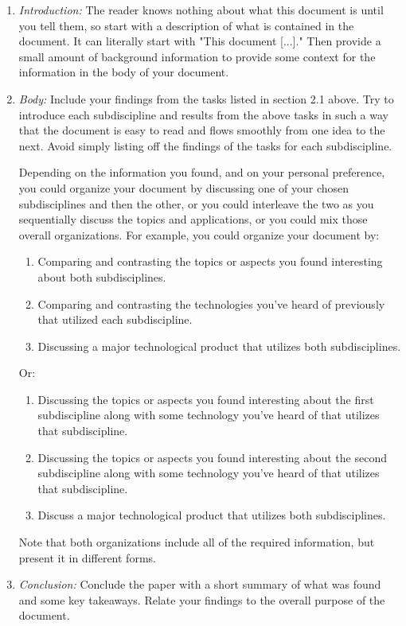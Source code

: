 \documentclass[12pt]{article}
\begin{document}
\begin{enumerate}
    \item \textit{Introduction:} The reader knows nothing about what this document is until you tell them, so start with a description of what is contained in the document.  It can literally start with "This document [...]." Then provide a small amount of background information to provide some context for the information in the body of your document.
    
    \item \textit{Body:} Include your findings from the tasks listed in section 2.1 above. Try to introduce each subdiscipline and results from the above tasks in such a way that the document is easy to read and flows smoothly from one idea to the next. Avoid simply listing off the findings of the tasks for each subdiscipline.
    
    Depending on the information you found, and on your personal preference, you could organize your document by discussing one of your chosen subdisciplines and then the other, or you could interleave the two as you sequentially discuss the topics and applications, or you could mix those overall organizations.  For example, you could organize your document by:
    \begin{enumerate}
        \item Comparing and contrasting the topics or aspects you found interesting about both subdisciplines.
        \item Comparing and contrasting the technologies you've heard of previously that utilized each subdiscipline.
        \item Discussing a major technological product that utilizes both subdisciplines.
    \end{enumerate}
    Or:
    \begin{enumerate}
        \item Discussing the topics or aspects you found interesting about the first subdiscipline along with some technology you've heard of that utilizes that subdiscipline.
        \item Discussing the topics or aspects you found interesting about the second subdiscipline along with some technology you've heard of that utilizes that subdiscipline.
        \item Discuss a major technological product that utilizes both subdisciplines.
    \end{enumerate}
    Note that both organizations include all of the required information, but present it in different forms.
    
    \item \textit{Conclusion:} Conclude the paper with a short summary of what was found and some key takeaways.  Relate your findings to the overall purpose of the document.
\end{enumerate}
\end{document}
